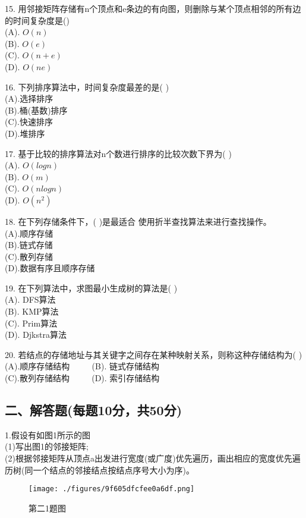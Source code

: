 15. 用邻接矩阵存储有n个顶点和e条边的有向图，则删除与某个顶点相邻的所有边的时间复杂度是() \\
(A). $O(n)$ \\
(B). $O(e)$ \\
(C). $O(n+e)$ \\
(D). $O(ne)$

16. 下列排序算法中，时间复杂度最差的是( ) \\
(A).选择排序 \\
(B).桶(基数)排序 \\
(C).快速排序 \\
(D).堆排序

17. 基于比较的排序算法对n个数进行排序的比较次数下界为( ) \\
(A). $O(logn)$ \\
(B). $O(m)$  \\
(C). $O(nlogn)$ \\
(D). $O(n^2)$

18. 在下列存储条件下，( )是最适合 使用折半查找算法来进行查找操作。 \\
(A).顺序存储 \\
(B).链式存储 \\
(C).散列存储 \\
(D).数据有序且顺序存储

19. 在下列算法中，求图最小生成树的算法是( ) \\
(A). DFS算法 \\
(B). KMP算法 \\
(C). Prim算法 \\
(D). Djkstra算法

20. 若结点的存储地址与其关键字之间存在某种映射关系，则称这种存储结构为( ) \\
(A).顺序存储结构 $\qquad$ (B). 链式存储结构 \\
(C).散列存储结构 $\qquad$ (D). 索引存储结构

\subsection{二、解答题(每题10分，共50分)}

1.假设有如图1所示的图 \\
(1)写出图1的邻接矩阵; \\
(2)根据邻接矩阵从顶点a出发进行宽度(或广度)优先遍历，画出相应的宽度优先遍历树(同一个结点的邻接结点按结点序号大小为序)。
\begin{figure}[ht]
\centering
\texttt{[image: ./figures/9f605dfcfee0a6df.png]}
\caption{第二1题图} \label{fig_SYDS11_1}
\end{figure}

